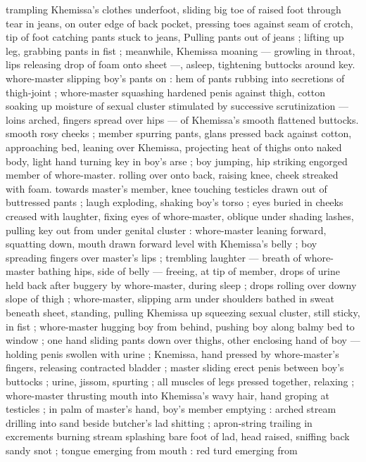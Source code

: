 trampling Khemissa's clothes underfoot, sliding big toe of raised foot 
through tear in jeans, on outer edge of back pocket, pressing toes 
against seam of crotch, tip of foot catching pants stuck to jeans, 
Pulling pants out of jeans ; lifting up leg, grabbing pants in fist ; 
meanwhile, Khemissa moaning --- growling in throat, lips releasing 
drop of foam onto sheet ---, asleep, tightening buttocks around key. 
whore-master slipping boy's pants on : hem of pants rubbing into 
secretions of thigh-joint ; whore-master squashing hardened penis 
against thigh, cotton soaking up moisture of sexual cluster 
stimulated by successive scrutinization --- loins arched, fingers 
spread over hips --- of Khemissa's smooth flattened buttocks. 
smooth rosy cheeks ; member spurring pants, glans pressed back 
against cotton, approaching bed, leaning over Khemissa, projecting 
heat of thighs onto naked body, light hand turning key in boy's arse 
; boy jumping, hip striking engorged member of whore-master. 
rolling over onto back, raising knee, cheek streaked with foam. 
towards master's member, knee touching testicles drawn out of 
buttressed pants ; laugh exploding, shaking boy's torso ; eyes buried 
in cheeks creased with laughter, fixing eyes of whore-master, oblique 
under shading lashes, pulling key out from under genital cluster : 
whore-master leaning forward, squatting down, mouth drawn forward 
level with Khemissa's belly ; boy spreading fingers over master's lips 
; trembling laughter --- breath of whore-master bathing hips, side of 
belly --- freeing, at tip of member, drops of urine held back after 
buggery by whore-master, during sleep ; drops rolling over downy 
slope of thigh ; whore-master, slipping arm under shoulders bathed 
in sweat beneath sheet, standing, pulling Khemissa up squeezing 
sexual cluster, still sticky, in fist ; whore-master hugging boy from 
behind, pushing boy along balmy bed to window ; one hand sliding 
pants down over thighs, other enclosing hand of boy --- holding 
penis swollen with urine ; Knemissa, hand pressed by whore-master's 
fingers, releasing contracted bladder ; master sliding erect penis 
between boy's buttocks ; urine, jissom, spurting ; all muscles of legs 
pressed together, relaxing ; whore-master thrusting mouth into 
Khemissa's wavy hair, hand groping at testicles ; in palm of master's 
hand, boy's member emptying : arched stream drilling into sand 
beside butcher's lad shitting ; apron-string trailing in excrements 
burning stream splashing bare foot of lad, head raised, sniffing back 
sandy snot ; tongue emerging from mouth : red turd emerging from 
